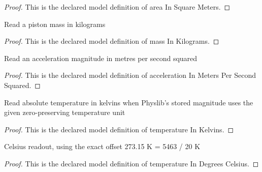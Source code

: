 \begin{proof}
  This is the declared model definition of area In Square Meters.
\end{proof}
\begin{definition}
  \label{def:physics:phyx-mini-0449:phyxminiproblems-problemphyxmini0449-massinkilograms}
  Read a piston mass in kilograms
\end{definition}
\begin{proof}
  This is the declared model definition of mass In Kilograms.
\end{proof}
\begin{definition}
  \label{def:physics:phyx-mini-0449:phyxminiproblems-problemphyxmini0449-accelerationinmeterspersecondsquared}
  Read an acceleration magnitude in metres per second squared
\end{definition}
\begin{proof}
  This is the declared model definition of acceleration In Meters Per Second Squared.
\end{proof}
\begin{definition}
  \label{def:physics:phyx-mini-0449:phyxminiproblems-problemphyxmini0449-temperatureinkelvins}
  Read absolute temperature in kelvins when Physlib's stored magnitude uses the given zero-preserving temperature unit
\end{definition}
\begin{proof}
  This is the declared model definition of temperature In Kelvins.
\end{proof}
\begin{definition}
  \label{def:physics:phyx-mini-0449:phyxminiproblems-problemphyxmini0449-temperatureindegreescelsius}
  Celsius readout, using the exact offset 273.15 K = 5463 / 20 K
\end{definition}
\begin{proof}
  This is the declared model definition of temperature In Degrees Celsius.
\end{proof}
